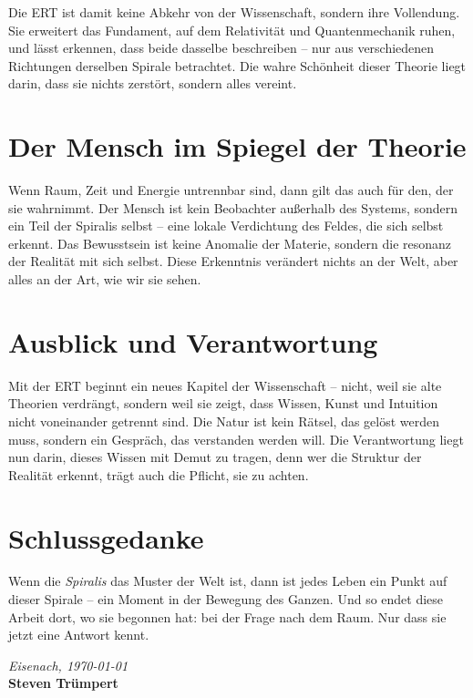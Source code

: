 Die \acrshort{ERT} ist damit keine Abkehr von der Wissenschaft, sondern ihre Vollendung.  
Sie erweitert das Fundament, auf dem Relativität und Quantenmechanik ruhen,  
und lässt erkennen, dass beide dasselbe beschreiben –  
nur aus verschiedenen Richtungen derselben Spirale betrachtet.  
Die wahre Schönheit dieser Theorie liegt darin,  
dass sie nichts zerstört, sondern alles vereint.

\section*{Der Mensch im Spiegel der Theorie}
Wenn Raum, Zeit und Energie untrennbar sind,  
dann gilt das auch für den, der sie wahrnimmt.  
Der Mensch ist kein Beobachter außerhalb des Systems,  
sondern ein Teil der Spiralis selbst –  
eine lokale Verdichtung des Feldes, die sich selbst erkennt.  
Das Bewusstsein ist keine Anomalie der Materie,  
sondern die \gls{resonanz} der Realität mit sich selbst.  
Diese Erkenntnis verändert nichts an der Welt,  
aber alles an der Art, wie wir sie sehen.

\section*{Ausblick und Verantwortung}
Mit der \acrshort{ERT} beginnt ein neues Kapitel der Wissenschaft –  
nicht, weil sie alte Theorien verdrängt,  
sondern weil sie zeigt, dass Wissen, Kunst und Intuition  
nicht voneinander getrennt sind.  
Die Natur ist kein Rätsel, das gelöst werden muss,  
sondern ein Gespräch, das verstanden werden will.  
Die Verantwortung liegt nun darin, dieses Wissen mit Demut zu tragen,  
denn wer die Struktur der Realität erkennt,  
trägt auch die Pflicht, sie zu achten.

\section*{Schlussgedanke}
Wenn die \emph{Spiralis} das Muster der Welt ist,  
dann ist jedes Leben ein Punkt auf dieser Spirale –  
ein Moment in der Bewegung des Ganzen.  
Und so endet diese Arbeit dort, wo sie begonnen hat:  
bei der Frage nach dem Raum.  
Nur dass sie jetzt eine Antwort kennt.

\vspace{20em}
\begin{flushright}
\textit{Eisenach, {\today}} 
\\[0.5em]
\textbf{Steven Trümpert}
\end{flushright}
